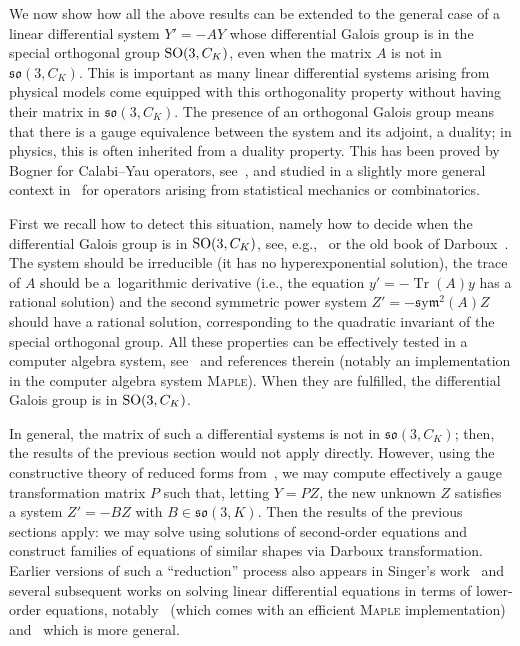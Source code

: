 \documentclass[pdftex]{sigma}%
\numberwithin{equation}{section}
\def\sym{\mathfrak{s}\mathrm{y}\mathfrak{m}}
\begin{document}
We now show how all the above results can be extended to the general case of a linear differential system $Y' = -A Y$ whose differential Galois group is in the special orthogonal group ${\rm SO}(3, C_K)$, even when the
 matrix $A$ is not in $\mathfrak{so}(3, C_K)$. This is important as many linear differential systems arising from physical models come equipped with this orthogonality property without having their matrix in $\mathfrak{so}(3, C_K)$. The presence of an orthogonal Galois group means that there is a gauge equivalence between the system and its adjoint, a duality; in physics, this is often inherited from a duality property. This has been proved by Bogner for Calabi--Yau operators, see~\cite{Bo13a,BoRe13a}, and studied in a slightly more general context in~\cite{BoBoMaWe15a,BoHaMaWe14a,BoHaMaWe15a} for operators arising from statistical mechanics or combinatorics.

First we recall how to detect this situation, namely how to decide
when the differential Galois group is in ${\rm SO}(3, C_K)$, see, e.g.,~\cite{NgPu10a,Si88a,Ho07a} or the old book of Darboux~\cite[pp.~28--29]{da3}. The system should be irreducible (it has no hyperexponential solution), the trace of $A$ should be a~logarithmic derivative (i.e., the equation $y'=-\operatorname{Tr}(A)y$ has a rational solution) and the second symmetric power system $Z' = -\sym^2(A) Z$ should have a rational solution, corresponding to the quadratic invariant of the special orthogonal group. All these properties can be effectively tested in a computer algebra system, see~\cite{BaClElWe12a} and references therein (notably an implementation in the computer algebra system \textsc{Maple}).
When they are fulfilled, the differential Galois group is in ${\rm SO}(3, C_K)$.

In general, the matrix of such a differential systems is not in $\mathfrak{so}(3, C_K)$; then, the results of the previous section would not apply directly. However, using the constructive theory of reduced forms from~\cite{BaClDiWe20a, BaClDiWe16a}, we may compute effectively a gauge transformation matrix $P$ such that, letting $Y=PZ$, the new unknown $Z$ satisfies a system $Z'=-BZ$ with $B\in \mathfrak{so}(3, K)$. Then the results of the previous sections apply: we may solve using solutions of second-order equations and construct families of equations of similar shapes via Darboux transformation.
Earlier versions of such a ``reduction'' process also appears in Singer's work~\cite{Si88a} and several subsequent works on solving linear differential equations in terms of lower-order equations, notably~\cite{Ho07a} (which comes with an efficient \textsc{Maple} implementation) and~\cite{NgPu10a} which is more general.
\end{document}
